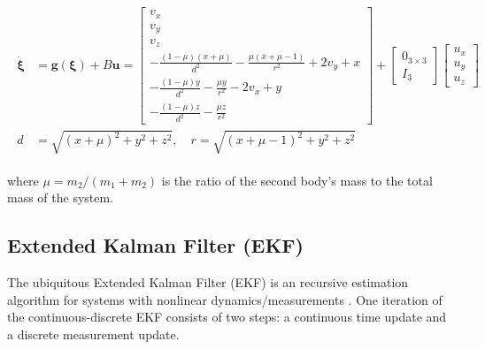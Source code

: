\documentclass[letterpaper, preprint, paper,11pt]{AAS}	%
\begin{document}
\begin{align}
\begin{aligned}
    \dot{\bm{\xi}} &= \bm{g}(\bm{\xi}) + B\bm{u}= \begin{bmatrix}
        v_x \\
        v_y \\
        v_z \\
        -\frac{(1 - \mu)(x + \mu)}{d^2} - \frac{\mu(x + \mu - 1)}{r^2} + 2v_y + x\\
        -\frac{(1 - \mu)y}{d^2} - \frac{\mu y}{r^2} - 2v_x + y\\
        -\frac{(1 - \mu)z}{d^2} - \frac{\mu z}{r^2}
    \end{bmatrix} + \begin{bmatrix}
        0_{3 \times 3} \\
        I_3
    \end{bmatrix} \begin{bmatrix}
        u_x \\
        u_y \\
        u_z
    \end{bmatrix} \\
    d &= \sqrt{(x+\mu)^2 + y^2 + z^2}, \quad r = \sqrt{(x + \mu - 1)^2 + y^2 + z^2}
\end{aligned}
\end{align}

\noindent where $\mu = m_2/(m_1 + m_2)$ is the ratio of the second body's mass to the total mass of the system.

\subsection{Extended Kalman Filter (EKF)}

The ubiquitous Extended Kalman Filter (EKF) is an recursive estimation algorithm for systems with nonlinear dynamics/measurements \cite{smith1962application}. One iteration of the continuous-discrete EKF consists of two steps: a continuous time update and a discrete measurement update.
\end{document}
